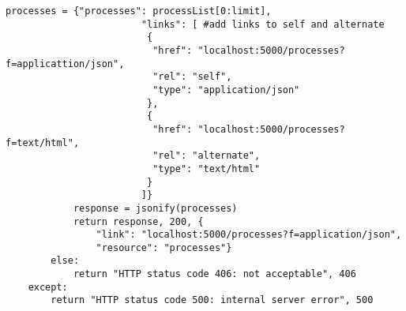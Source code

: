\begin{lstlisting}[caption={Process List Endpoint}, style = Python]
            processes = {"processes": processList[0:limit],
                        "links": [ #add links to self and alternate
                         {
                          "href": "localhost:5000/processes?f=applicattion/json",
                          "rel": "self",
                          "type": "application/json"
                         },
                         {
                          "href": "localhost:5000/processes?f=text/html",
                          "rel": "alternate",
                          "type": "text/html"
                         }
                        ]}
            response = jsonify(processes) 
            return response, 200, {
                "link": "localhost:5000/processes?f=application/json", 
                "resource": "processes"} 
        else:
            return "HTTP status code 406: not acceptable", 406 
    except:
        return "HTTP status code 500: internal server error", 500 
      
\end{lstlisting}   
